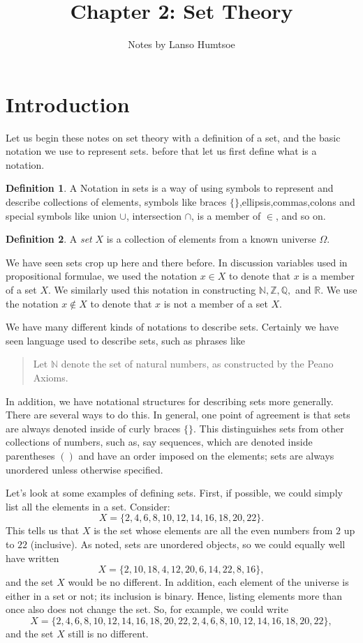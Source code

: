 \documentclass{article}
\theoremstyle{definition}
\newtheorem{definition}{Definition}
\newcommand{\Z}{\mathbb{Z}}
\newcommand{\N}{\mathbb{N}}
\newcommand{\Q}{\mathbb{Q}}
\newcommand{\R}{\mathbb{R}}
\begin{document}
\title{Chapter 2: Set Theory}
\author{Notes by Lanso Humtsoe}
\maketitle
\section{Introduction}

Let us begin these notes on set theory with a definition of a set, and the basic notation we use to represent sets.
before that let us first define what is a notation. 

\begin{definition}
A Notation in sets is a way of using symbols to represent and
describe collections of elements, symbols like braces $\{\}$,ellipsis,commas,colons and special symbols
like union $\cup$, intersection $\cap$, is a member of $\in$, and so on.
\end{definition}

\begin{definition}
A {\it set} $X$ is a collection of elements from a known universe $\Omega$.
\end{definition}

We have seen sets crop up here and there before. In discussion variables used in propositional formulae, we used the notation $x\in X$ to denote that $x$ is a member of a set $X$. We similarly used this notation in constructing $\N, \Z, \Q,$ and $\R$. We use the notation $x\notin X$ to denote that $x$ is not a member of a set $X$.

We have many different kinds of notations to describe sets. Certainly we have seen language used to describe sets, such as phrases like 
\begin{quote}
Let $\N$ denote the set of natural numbers, as constructed by the Peano Axioms.
\end{quote} In addition, we have notational structures for describing sets more generally. There are several ways to do this. In general, one point of agreement is that sets are always denoted inside of curly braces $\{\}$. This distinguishes sets from other collections of numbers, such as, say sequences, which are denoted inside parentheses $()$ and have an order imposed on the elements; sets are always unordered unless otherwise specified.

Let's look at some examples of defining sets. First, if possible, we could simply list all the elements in a set. Consider:
\[ X = \{2, 4, 6, 8, 10, 12, 14, 16, 18, 20, 22\}.\]
This tells us that $X$ is the set whose elements are all the even numbers from $2$ up to $22$ (inclusive). As noted, sets are unordered objects, so we could equally well have written
\[ X=\{2, 10, 18, 4, 12, 20, 6, 14, 22, 8, 16\},\]
and the set $X$ would be no different. In addition, each element of the universe is either in a set or not; its inclusion is binary. Hence, listing elements more than once also does not change the set. So, for example, we could write
\[ X = \{2, 4, 6, 8, 10, 12, 14, 16, 18, 20, 22, 2, 4, 6, 8, 10, 12, 14, 16, 18, 20, 22\},\]
and the set $X$ still is no different.
\end{document}
